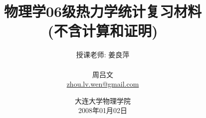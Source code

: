 \documentclass[a4paper,titlepage]{caspset}
\begin{document}
\title{物理学06级热力学统计复习材料\\(不含计算和证明)
 \vspace{-20pt}}
\author{{\Large 授课老师: 姜良萍}\\ \vspace{50pt}\\ 周吕文\\ \href{mailto:zhou.lv.wen@gmail.com}{zhou.lv.wen@gmail.com}\\ \vspace{50pt}}
\date{大连大学物理学院\\2008年01月02日}
\maketitle

\tableofcontents

\newpage

\end{document}
